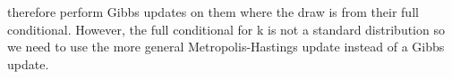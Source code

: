 \documentclass[11pt]{article}
\begin{document}
therefore perform Gibbs updates on them where the draw is from their
full conditional. However, the full conditional for k is not a
standard distribution so we need to use the more general
Metropolis-Hastings update instead of a Gibbs update.\\\\
\end{document}

